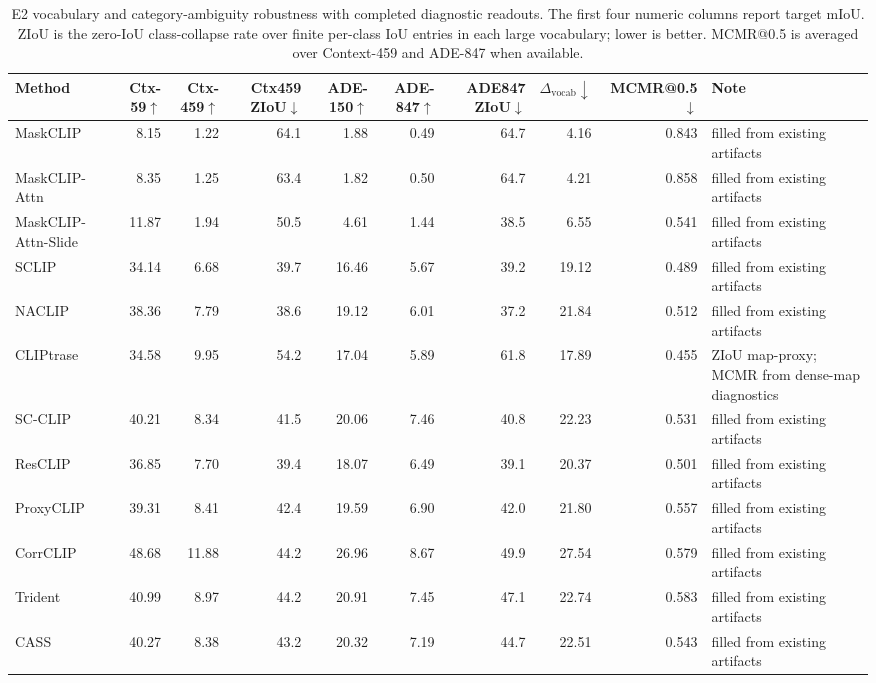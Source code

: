\begin{table}[t]
\centering
\scriptsize
\caption{E2 vocabulary and category-ambiguity robustness with completed diagnostic readouts. The first four numeric columns report target mIoU. ZIoU is the zero-IoU class-collapse rate over finite per-class IoU entries in each large vocabulary; lower is better. MCMR@0.5 is averaged over Context-459 and ADE-847 when available.}
\label{tab:e2-vocab-robustness-filled}
\setlength{\tabcolsep}{2.5pt}
\begin{adjustbox}{max width=\textwidth}
\begin{tabular}{lrrrrrrrrp{}}
\toprule
Method & Ctx-59$\uparrow$ & Ctx-459$\uparrow$ & Ctx459 ZIoU$\downarrow$ & ADE-150$\uparrow$ & ADE-847$\uparrow$ & ADE847 ZIoU$\downarrow$ & $\Delta_{\mathrm{vocab}}\downarrow$ & MCMR@0.5$\downarrow$ & Note \\
\midrule
MaskCLIP & 8.15 & 1.22 & 64.1 & 1.88 & 0.49 & 64.7 & 4.16 & 0.843 & filled from existing artifacts \\
MaskCLIP-Attn & 8.35 & 1.25 & 63.4 & 1.82 & 0.50 & 64.7 & 4.21 & 0.858 & filled from existing artifacts \\
MaskCLIP-Attn-Slide & 11.87 & 1.94 & 50.5 & 4.61 & 1.44 & 38.5 & 6.55 & 0.541 & filled from existing artifacts \\
SCLIP & 34.14 & 6.68 & 39.7 & 16.46 & 5.67 & 39.2 & 19.12 & 0.489 & filled from existing artifacts \\
NACLIP & 38.36 & 7.79 & 38.6 & 19.12 & 6.01 & 37.2 & 21.84 & 0.512 & filled from existing artifacts \\
CLIPtrase & 34.58 & 9.95 & 54.2 & 17.04 & 5.89 & 61.8 & 17.89 & 0.455 & ZIoU map-proxy; MCMR from dense-map diagnostics \\
SC-CLIP & 40.21 & 8.34 & 41.5 & 20.06 & 7.46 & 40.8 & 22.23 & 0.531 & filled from existing artifacts \\
ResCLIP & 36.85 & 7.70 & 39.4 & 18.07 & 6.49 & 39.1 & 20.37 & 0.501 & filled from existing artifacts \\
ProxyCLIP & 39.31 & 8.41 & 42.4 & 19.59 & 6.90 & 42.0 & 21.80 & 0.557 & filled from existing artifacts \\
CorrCLIP & 48.68 & 11.88 & 44.2 & 26.96 & 8.67 & 49.9 & 27.54 & 0.579 & filled from existing artifacts \\
Trident & 40.99 & 8.97 & 44.2 & 20.91 & 7.45 & 47.1 & 22.74 & 0.583 & filled from existing artifacts \\
CASS & 40.27 & 8.38 & 43.2 & 20.32 & 7.19 & 44.7 & 22.51 & 0.543 & filled from existing artifacts \\

\end{tabular}
\end{adjustbox}
\end{table}
